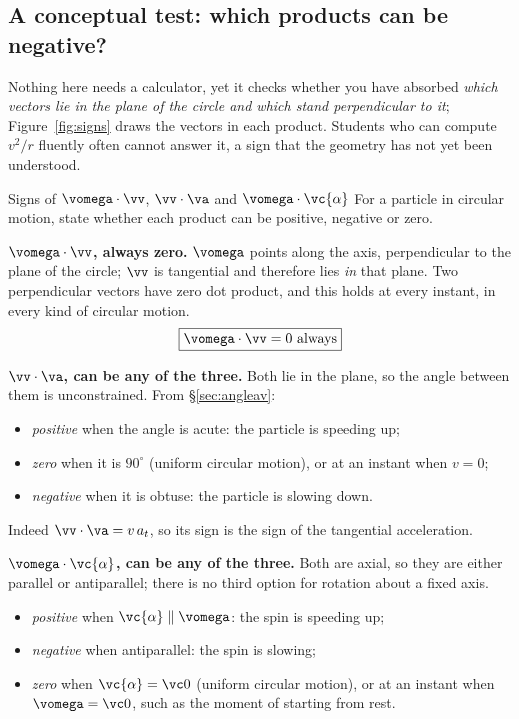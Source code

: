 \medskip
\subsection{A conceptual test: which products can be negative?}

Nothing here needs a calculator, yet it checks whether you have absorbed \emph{which vectors lie in the
plane of the circle and which stand perpendicular to it}; Figure~\ref{fig:signs} draws the vectors in
each product. Students who can compute $v^{2}/r$ fluently
often cannot answer it, a sign that the geometry has not yet been understood.


\begin{figure}[htbp]
\centering
{}
\end{figure}

\begin{exbox}{Signs of $\vomega\cdot\vv$, $\vv\cdot\va$ and $\vomega\cdot\vc{\alpha}$}
For a particle in circular motion, state whether each product can be positive, negative or zero.

 \textbf{$\vomega\cdot\vv$, always zero.} $\vomega$ points along the axis, perpendicular to
the plane of the circle; $\vv$ is tangential and therefore lies \emph{in} that plane. Two perpendicular
vectors have zero dot product, and this holds at every instant, in every kind of circular motion.
\[
\boxed{\vomega\cdot\vv=0\ \text{always}}
\]

 \textbf{$\vv\cdot\va$, can be any of the three.} Both lie in the plane, so the angle
between them is unconstrained. From \S\ref{sec:angleav}:
\begin{itemize}
\item \emph{positive} when the angle is acute: the particle is speeding up;
\item \emph{zero} when it is $90^\circ$ (uniform circular motion), or at an instant when $v=0$;
\item \emph{negative} when it is obtuse: the particle is slowing down.
\end{itemize}
Indeed $\vv\cdot\va=v\,a_t$, so its sign is the sign of the tangential acceleration.

 \textbf{$\vomega\cdot\vc{\alpha}$, can be any of the three.} Both are axial, so they are either
parallel or antiparallel; there is no third option for rotation about a fixed axis.
\begin{itemize}
\item \emph{positive} when $\vc{\alpha}\parallel\vomega$: the spin is speeding up;
\item \emph{negative} when antiparallel: the spin is slowing;
\item \emph{zero} when $\vc{\alpha}=\vc0$ (uniform circular motion), or at an instant when
      $\vomega=\vc0$, such as the moment of starting from rest.
\end{itemize}
\end{exbox}

